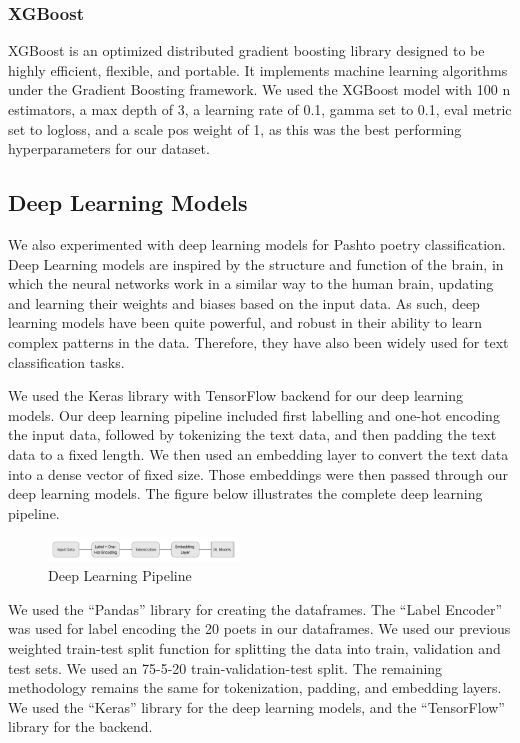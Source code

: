 \subsubsection{XGBoost}
XGBoost is an optimized distributed gradient boosting library designed to be highly efficient, flexible, and portable. It implements machine learning algorithms under the Gradient Boosting framework. We used the XGBoost model with 100 n estimators, a max depth of 3, a learning rate of 0.1, gamma set to 0.1, eval metric set to logloss, and a scale pos weight of 1, as this was the best performing hyperparameters for our dataset.


\subsection{Deep Learning Models}
We also experimented with deep learning models for Pashto poetry classification. Deep Learning models are inspired by the structure and function of the brain, in which the neural networks work in a similar way to the human brain, updating and learning their weights and biases based on the input data. As such, deep learning models have been quite powerful, and robust in their ability to learn complex patterns in the data. Therefore, they have also been widely used for text classification tasks.  

We used the Keras library with TensorFlow backend for our deep learning models. Our deep learning pipeline included first labelling and one-hot encoding the input data, followed by tokenizing the text data, and then padding the text data to a fixed length. We then used an embedding layer to convert the text data into a dense vector of fixed size. Those embeddings were then passed through our deep learning models. The figure below illustrates the complete deep learning pipeline.

\begin{figure}[H]
    \centering
    \includegraphics[width=0.45\textwidth]{dl_pipe.png}
    \caption{Deep Learning Pipeline}
\end{figure}

We used the ``Pandas'' library for creating the dataframes. The ``Label Encoder'' was used for label encoding the 20 poets in our dataframes. We used our previous weighted train-test split function for splitting the data into train, validation and test sets. We used an 75-5-20 train-validation-test split. The remaining methodology remains the same for tokenization, padding, and embedding layers. We used the ``Keras'' library for the deep learning models, and the ``TensorFlow'' library for the backend.

